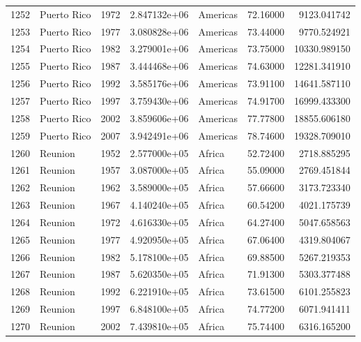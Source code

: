 \documentclass[
  letterpaper,
  DIV=11,
  numbers=noendperiod]{scrreprt}
\begin{document}
\begin{tabular}{llrrlrr}
1252 &               Puerto Rico &  1972 &  2.847132e+06 &  Americas &  72.16000 &    9123.041742 \\
1253 &               Puerto Rico &  1977 &  3.080828e+06 &  Americas &  73.44000 &    9770.524921 \\
1254 &               Puerto Rico &  1982 &  3.279001e+06 &  Americas &  73.75000 &   10330.989150 \\
1255 &               Puerto Rico &  1987 &  3.444468e+06 &  Americas &  74.63000 &   12281.341910 \\
1256 &               Puerto Rico &  1992 &  3.585176e+06 &  Americas &  73.91100 &   14641.587110 \\
1257 &               Puerto Rico &  1997 &  3.759430e+06 &  Americas &  74.91700 &   16999.433300 \\
1258 &               Puerto Rico &  2002 &  3.859606e+06 &  Americas &  77.77800 &   18855.606180 \\
1259 &               Puerto Rico &  2007 &  3.942491e+06 &  Americas &  78.74600 &   19328.709010 \\
1260 &                   Reunion &  1952 &  2.577000e+05 &    Africa &  52.72400 &    2718.885295 \\
1261 &                   Reunion &  1957 &  3.087000e+05 &    Africa &  55.09000 &    2769.451844 \\
1262 &                   Reunion &  1962 &  3.589000e+05 &    Africa &  57.66600 &    3173.723340 \\
1263 &                   Reunion &  1967 &  4.140240e+05 &    Africa &  60.54200 &    4021.175739 \\
1264 &                   Reunion &  1972 &  4.616330e+05 &    Africa &  64.27400 &    5047.658563 \\
1265 &                   Reunion &  1977 &  4.920950e+05 &    Africa &  67.06400 &    4319.804067 \\
1266 &                   Reunion &  1982 &  5.178100e+05 &    Africa &  69.88500 &    5267.219353 \\
1267 &                   Reunion &  1987 &  5.620350e+05 &    Africa &  71.91300 &    5303.377488 \\
1268 &                   Reunion &  1992 &  6.221910e+05 &    Africa &  73.61500 &    6101.255823 \\
1269 &                   Reunion &  1997 &  6.848100e+05 &    Africa &  74.77200 &    6071.941411 \\
1270 &                   Reunion &  2002 &  7.439810e+05 &    Africa &  75.74400 &    6316.165200 \\

\end{tabular}
\end{document}
